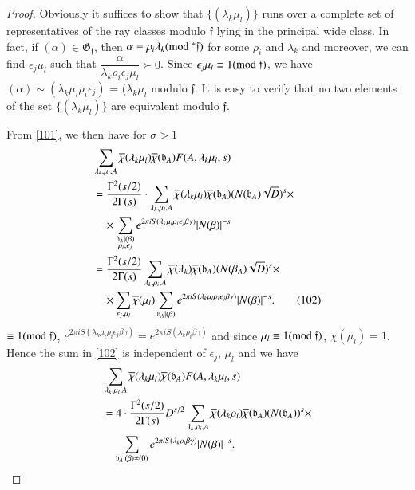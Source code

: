 \begin{proof}
Obviously it suffices to show that $\{(\lambda_{k}\mu_{l})\}$ runs
over a complete set of representatives of the ray classes modulo
$\mathfrak{f}$ lying in the principal wide class. In fact, if
$(\alpha)\in \mathfrak{G}_{\mathfrak{f}}$, then $\alpha\equiv
\rho_{i}\lambda_{k}(\rm{mod} \;^{\ast}\mathfrak{f})$ for some\pageoriginale
$\rho_{i}$ and $\lambda_{k}$ and moreover, we can find
$\epsilon_{j}\mu_{l}$ such that
$\dfrac{\alpha}{\lambda_{k}\rho_{i}\epsilon_{j}\mu_{l}} \succ 0$. Since
$\epsilon_{j}\mu_{l}\equiv 1(\rm{mod} \;\mathfrak{f})$, we have
$(\alpha)\sim(\lambda_{k}\mu_{l}\rho_{i}\epsilon_{j})$ =
($\lambda_{k}\mu_{l}$ modulo $\mathfrak{f}$. It is easy to verify that
no two elements of the set $\{(\lambda_{k}\mu_{l})\}$ are equivalent
modulo $\mathfrak{f}$.

From \eqref{101}, we then have for $\sigma>1$
\begin{align*}
&
  \sum_{\lambda_{k},\mu_{l},A}\overline{\chi}(\lambda_{k}\mu_{l})\overline{\chi}(\mathfrak{b}_{A})F(A,\lambda_{k}\mu_{l},s)\\
&=\frac{\Gamma^{2}(s/2)}{2\Gamma(s)}\cdot
  \sum_{\lambda_{k},\mu_{l},A}\overline{\chi}(\lambda_{k}\mu_{l})\overline{\chi}(\mathfrak{b}_{A})(N(\mathfrak{b}_{A})\sqrt{D})^{s}\times\\
&\quad \times
  \sum_{\substack{\mathfrak{b}_{A}|(\beta)\\ \rho_{i},\epsilon_{j}}}e^{2\pi
    iS(\lambda_{k}\mu_{l}\rho_{i}\epsilon_{j}\beta\gamma)}|N(\beta)|^{-s}\\
&=
  \frac{\Gamma^{2}(s/2)}{2\Gamma(s)}\sum_{\lambda_{k},\rho_{i},A}\overline{\chi}(\lambda_{k})\overline{\chi}(\mathfrak{b}_{A})(N(\beta_{A})\sqrt{D})^{s}\times\\
&\quad
  \times\sum_{\epsilon_{j},\mu_{l}}\overline{\chi}(\mu_{l})\sum_{\mathfrak{b}_{A}|(\beta)}e^{2\pi
    iS(\lambda_{k}\mu_{l}\rho_{i}\epsilon_{j}\beta\gamma)}|N(\beta)|^{-s}.\tag{102}\label{102} 
\end{align*}
$\equiv 1(\rm{mod} \; \mathfrak{f})$, $e^{2\pi
  iS(\lambda_{k}\mu_{l}\rho_{i}\epsilon_{j}\beta\gamma)}=e^{2\pi
  iS(\lambda_{k}\rho_{i}\beta\gamma)}$ and since $\mu_{l}\equiv 1(\rm{mod} \;
\mathfrak{f})$, $\chi(\mu_{l})=1$. Hence the sum in \eqref{102} is
independent of $\epsilon_{j}$, $\mu_{l}$ and we have
\begin{align*}
& \sum_{\lambda_{k},\mu_{l},A}\overline{\chi}(\lambda_{k}\mu_{l})\overline{\chi}(\mathfrak{b}_{A})F(A,\lambda_{k}\mu_{l},s)\\
&=4\cdot
  \frac{\Gamma^{2}(s/2)}{2\Gamma(s)}D^{s/2}\sum_{\lambda_{k},\rho_{i},A}\overline{\chi}(\lambda_{k}\rho_{i})\overline{\chi}(\mathfrak{b}_{A})(N(\mathfrak{b}_{A}))^{s}\times\\ 
&\quad \sum_{\mathfrak{b}_{A}|(\beta)\neq (0)}e^{2\pi
    iS(\lambda_{k}\rho_{i}\beta\gamma)}|N(\beta)|^{-s}. 
\end{align*}
\end{proof}

